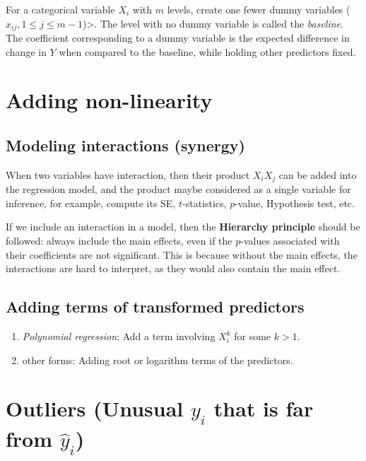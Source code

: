 \documentclass[
  letterpaper,
  DIV=11,
  numbers=noendperiod]{scrreprt}
\providecommand{\tightlist}{%
  \setlength{\itemsep}{0pt}\setlength{\parskip}{0pt}}\usepackage{longtable,booktabs,array}
\begin{document}
For a categorical variable \(X_i\) with \(m\) levels, create one fewer
dummy variables (\(x_{ij}, 1\le j \le m-1\))\textgreater. The level with
no dummy variable is called the \emph{baseline}. The coefficient
corresponding to a dummy variable is the expected difference in change
in \(Y\) when compared to the baseline, while holding other predictors
fixed.

\section{Adding non-linearity}\label{adding-non-linearity}

\subsection{Modeling interactions
(synergy)}\label{modeling-interactions-synergy}

When two variables have interaction, then their product \(X_iX_j\) can
be added into the regression model, and the product maybe considered as
a single variable for inference, for example, compute its SE,
\(t\)-statistics, \(p\)-value, Hypothesis test, etc.

If we include an interaction in a model, then the \textbf{Hierarchy
principle} should be followed: always include the main effects, even if
the \(p\)-values associated with their coefficients are not significant.
This is because without the main effects, the interactions are hard to
interpret, as they would also contain the main effect.

\subsection{Adding terms of transformed
predictors}\label{adding-terms-of-transformed-predictors}

\begin{enumerate}
\def\labelenumi{\arabic{enumi})}
\tightlist
\item
  \emph{Polynomial regression}: Add a term involving \(X_i^k\) for some
  \(k>1\).
\item
  other forms: Adding root or logarithm terms of the predictors.
\end{enumerate}

\section{\texorpdfstring{Outliers (Unusual \(y_i\) that is far from
\(\hat{y}_i\))}{Outliers (Unusual y\_i that is far from \textbackslash hat\{y\}\_i)}}\label{outliers-unusual-y_i-that-is-far-from-haty_i}
\end{document}
